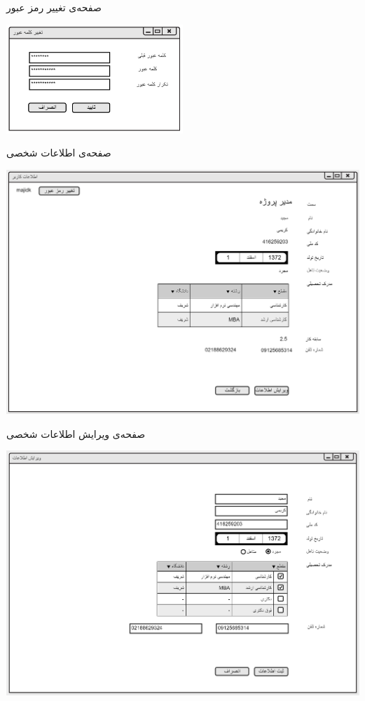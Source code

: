 \vspace{1cm}
صفحه‌ی تغییر رمز عبور
\begin{center}
\includegraphics[width=0.5\textwidth]{Prototype/Accounting/ChangePassword.png}
\end{center}

\newpage
\vspace{1cm}
صفحه‌ی اطلاعات شخصی 
\begin{center}
\includegraphics[width=\textwidth]{Prototype/Accounting/PersonalInformation.png}
\end{center}

\vspace{1cm}
صفحه‌ی ویرایش اطلاعات شخصی 
\begin{center}
\includegraphics[width=\textwidth]{Prototype/Accounting/EditPersonalInformation.png}
\end{center}


